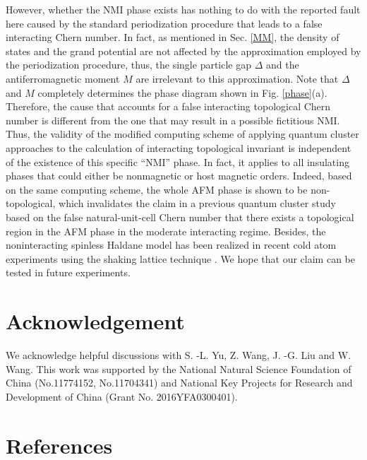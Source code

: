 \documentclass[12pt]{iopart}
\begin{document}
\par However, whether the NMI phase exists has nothing to do with the reported fault here caused by the standard periodization procedure that leads to a false interacting Chern number. In fact, as mentioned in Sec. \ref{MM}, the density of states and the grand potential are not affected by the approximation employed by the periodization procedure, thus, the single particle gap $\Delta$ and the antiferromagnetic moment $M$ are irrelevant to this approximation. Note that $\Delta$ and $M$ completely determines the phase diagram shown in Fig. \ref{phase}(a). Therefore, the cause that accounts for a false interacting topological Chern number is different from the one that may result in a possible fictitious NMI. Thus, the validity of the modified computing scheme of applying quantum cluster approaches to the calculation of interacting topological invariant is independent of the existence of this specific ``NMI'' phase. In fact, it applies to all insulating phases that could either be nonmagnetic or host magnetic orders. Indeed, based on the same computing scheme, the whole AFM phase is shown to be non-topological, which invalidates the claim in a previous quantum cluster study \cite{WFSM_PRB2016} based on the false natural-unit-cell Chern number that there exists a topological region in the AFM phase in the moderate interacting regime. Besides, the noninteracting spinless Haldane model has been realized in recent cold atom experiments using the shaking lattice technique \cite{JMDRLUGE_N2014}. We hope that our claim can be tested in future experiments.


\section*{Acknowledgement}
\par We acknowledge helpful discussions with S. -L. Yu, Z. Wang, J. -G. Liu and W. Wang. This work was supported by the National Natural Science Foundation of China (No.11774152, No.11704341) and National Key Projects for Research and Development of China (Grant No. 2016YFA0300401).

\section*{References}

\end{document}
